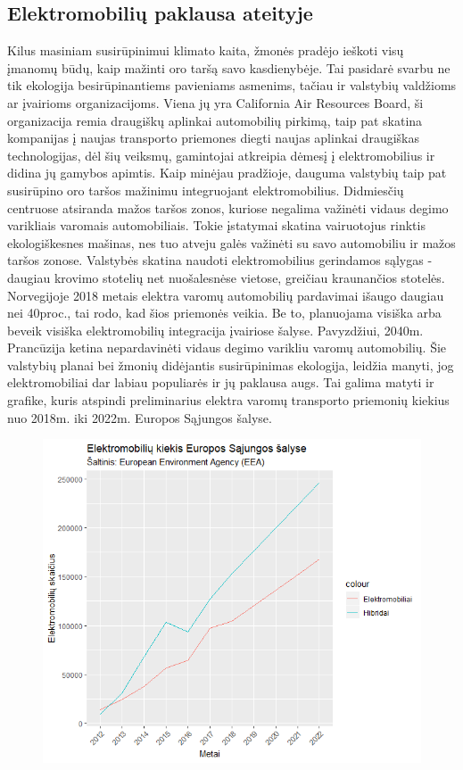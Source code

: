 \documentclass[12pt, titlepage]{article}
\begin{document}
\subsection{Elektromobilių paklausa ateityje}
Kilus masiniam susirūpinimui klimato kaita, žmonės pradėjo ieškoti visų įmanomų būdų, kaip mažinti oro taršą savo kasdienybėje. Tai pasidarė svarbu ne tik ekologija besirūpinantiems pavieniams asmenims, tačiau ir valstybių valdžioms ar įvairioms organizacijoms. Viena jų yra California Air Resources Board, ši organizacija remia draugiškų aplinkai automobilių pirkimą, taip pat skatina kompanijas į naujas transporto priemones diegti naujas aplinkai draugiškas technologijas, dėl šių veiksmų, gamintojai atkreipia dėmesį į elektromobilius ir didina jų gamybos apimtis. Kaip minėjau pradžioje, dauguma valstybių taip pat susirūpino oro taršos mažinimu integruojant elektromobilius. Didmiesčių centruose atsiranda mažos taršos zonos, kuriose negalima važinėti vidaus degimo varikliais varomais automobiliais. Tokie įstatymai skatina vairuotojus rinktis ekologiškesnes mašinas, nes tuo atveju galės važinėti su savo automobiliu ir mažos taršos zonose. Valstybės skatina naudoti elektromobilius gerindamos sąlygas - daugiau krovimo stotelių net nuošalesnėse vietose, greičiau kraunančios stotelės. Norvegijoje 2018 metais elektra varomų automobilių pardavimai išaugo daugiau nei 40proc., tai rodo, kad šios priemonės veikia. Be to, planuojama visiška arba beveik visiška elektromobilių integracija įvairiose šalyse. Pavyzdžiui, 2040m. Prancūzija ketina nepardavinėti vidaus degimo varikliu varomų automobilių. Šie valstybių planai bei žmonių didėjantis susirūpinimas ekologija, leidžia manyti, jog elektromobiliai dar labiau populiarės ir jų paklausa augs. Tai galima matyti ir grafike, kuris atspindi preliminarius elektra varomų transporto priemonių kiekius nuo 2018m. iki 2022m. Europos Sąjungos šalyse.
\newpage
\begin{figure}[h]
\centering
\includegraphics[scale=1]{elektromobiliai}
\end{figure}
\end{document}

